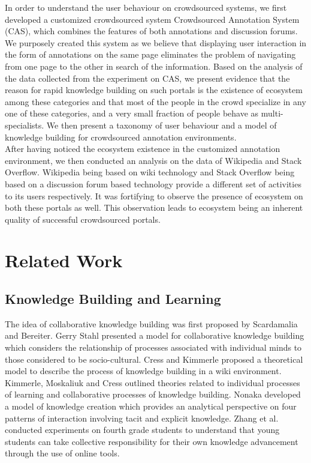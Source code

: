 \documentclass{llncs}
\begin{document}
In order to understand the user behaviour on crowdsourced systems, we first developed a customized crowdsourced system Crowdsourced Annotation System (CAS), which combines the features of both annotations and discussion forums. We purposely created this system as we believe that displaying user interaction in the form of annotations on the same page eliminates the problem of navigating from one page to the other in search of the information\cite{Zyto2012}\cite{Thomas2002}. Based on the analysis of the data collected from the experiment on CAS, we present evidence that the reason for rapid knowledge building on such portals is the existence of ecosystem among these categories and that most of the people in the crowd specialize in any one of these categories, and a very small fraction of people behave as multi-specialists. We then present a taxonomy of user behaviour and a model of knowledge building for crowdsourced annotation environments.\\

After having noticed the ecosystem existence in the customized annotation environment, we then conducted an analysis on the data of Wikipedia and Stack Overflow. Wikipedia being based on wiki technology and Stack Overflow being based on a discussion forum based technology provide a different set of activities to its users respectively. It was fortifying to observe the presence of ecosystem on both these portals as well. This observation leads to ecosystem being an inherent quality of successful crowdsourced portals.\\


\section{Related Work}\label{sec:related}

\subsection{Knowledge Building and Learning}
The idea of collaborative knowledge building was first proposed by Scardamalia and Bereiter\cite{scardamalia1994computer}.  Gerry Stahl\cite{Stahl2000} presented a model for collaborative knowledge building which considers the relationship of processes associated with individual minds to those considered to be socio-cultural. Cress and Kimmerle\cite{Cress2008} proposed a theoretical model to describe the process of knowledge building in a wiki environment. Kimmerle, Moskaliuk and Cress\cite{Kimmerle2011} outlined theories related to individual processes of learning and collaborative processes of knowledge building. Nonaka\cite{nonaka1994dynamic} developed a model of knowledge creation which provides an analytical perspective on four patterns of interaction involving tacit and explicit knowledge. Zhang et al.\cite{Zhang2007} conducted experiments on fourth grade students to understand that young students can take collective responsibility for their own knowledge advancement through the use of online tools.\\
\end{document}
